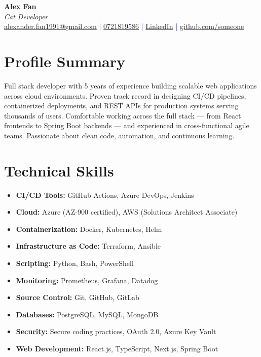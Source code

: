 \documentclass[a4paper,10pt]{article}
\begin{document}
\pagestyle{empty} %

\begin{center}
{\LARGE \textbf{Alex Fan}}\\[10pt]
{\Large \textit{Cat Developer}}\\[10pt]
\textcolor{darkblue}{\href{mailto:alexander.fan1991@gmail.com}{alexander.fan1991@gmail.com} | \href{tel:+0721819586}{0721819586} | \href{https://www.linkedin.com/in/zhimeng-fan-16767910a/}{LinkedIn} | \href{https://github.com/CatteryOffice}{github.com/someone}}
\end{center}

\section*{Profile Summary}
Full stack developer with 5 years of experience building scalable web applications across cloud environments. Proven track record in designing CI/CD pipelines, containerized deployments, and REST APIs for production systems serving thousands of users. Comfortable working across the full stack — from React frontends to Spring Boot backends — and experienced in cross-functional agile teams. Passionate about clean code, automation, and continuous learning.

\section*{Technical Skills}
\begin{itemize}[noitemsep]
\item \textbf{CI/CD Tools:} GitHub Actions, Azure DevOps, Jenkins
\item \textbf{Cloud:} Azure (AZ-900 certified), AWS (Solutions Architect Associate)
\item \textbf{Containerization:} Docker, Kubernetes, Helm
\item \textbf{Infrastructure as Code:} Terraform, Ansible
\item \textbf{Scripting:} Python, Bash, PowerShell
\item \textbf{Monitoring:} Prometheus, Grafana, Datadog
\item \textbf{Source Control:} Git, GitHub, GitLab
\item \textbf{Databases:} PostgreSQL, MySQL, MongoDB
\item \textbf{Security:} Secure coding practices, OAuth 2.0, Azure Key Vault
\item \textbf{Web Development:} React.js, TypeScript, Next.js, Spring Boot
\end{itemize}
\end{document}
